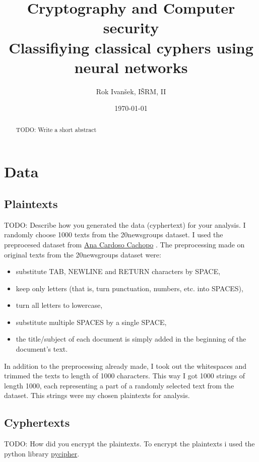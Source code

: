 \documentclass[a4paper]{article}
\title{Cryptography and Computer security\\
Classifiying classical cyphers using neural networks}
\author{Rok Ivanšek, IŠRM, II}
\date{\today}
\begin{document}
\maketitle


\begin{abstract}
TODO: Write a short abstract
\end{abstract}

\section*{Data}

\subsection*{Plaintexts}
TODO: Describe how you generated the data (cyphertext) for your analysis.
I randomly choose 1000 texts from the 20newsgroups dataset. I used the preprocesed dataset from \href{http://ana.cachopo.org/datasets-for-single-label-text-categorization}{Ana Cardoso Cachopo} \cite{2007:phd-Ana-Cardoso-Cachopo}. The preprocessing made on original texts from the 20newsgroups dataset were:

\begin{itemize}	
    \item substitute TAB, NEWLINE and RETURN characters by SPACE,
    \item keep only letters (that is, turn punctuation, numbers, etc. into SPACES),
    \item turn all letters to lowercase,
    \item substitute multiple SPACES by a single SPACE,
    \item the title/subject of each document is simply added in the beginning of the document's text.
\end{itemize}

In addition to the preprocessing already made, I took out the whitespaces and trimmed the texts to length of 1000 characters. This way I got 1000 strings of length 1000, each representing a part of a randomly selected text from the dataset. This strings were my chosen plaintexts for analysis.

\subsection*{Cyphertexts}
TODO: How did you encrypt the plaintexts.
To encrypt the plaintexts i used the python library \href{https://github.com/jameslyons/pycipher}{pycipher}.
\end{document}
